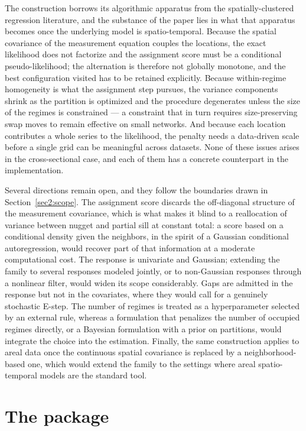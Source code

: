 The construction borrows its algorithmic apparatus from the spatially-clustered regression literature, and the substance of the paper lies in what that apparatus becomes once the underlying model is spatio-temporal. Because the spatial covariance of the measurement equation couples the locations, the exact likelihood does not factorize and the assignment score must be a conditional pseudo-likelihood; the alternation is therefore not globally monotone, and the best configuration visited has to be retained explicitly. Because within-regime homogeneity is what the assignment step pursues, the variance components shrink as the partition is optimized and the procedure degenerates unless the size of the regimes is constrained --- a constraint that in turn requires size-preserving swap moves to remain effective on small networks. And because each location contributes a whole series to the likelihood, the penalty needs a data-driven scale before a single grid can be meaningful across datasets. None of these issues arises in the cross-sectional case, and each of them has a concrete counterpart in the implementation.

Several directions remain open, and they follow the boundaries drawn in Section~\ref{sec2:scope}. The assignment score discards the off-diagonal structure of the measurement covariance, which is what makes it blind to a reallocation of variance between nugget and partial sill at constant total: a score based on a conditional density given the neighbors, in the spirit of a Gaussian conditional autoregression, would recover part of that information at a moderate computational cost. The response is univariate and Gaussian; extending the family to several responses modeled jointly, or to non-Gaussian responses through a nonlinear filter, would widen its scope considerably. Gaps are admitted in the response but not in the covariates, where they would call for a genuinely stochastic E-step. The number of regimes is treated as a hyperparameter selected by an external rule, whereas a formulation that penalizes the number of occupied regimes directly, or a Bayesian formulation with a prior on partitions, would integrate the choice into the estimation. Finally, the same construction applies to areal data once the continuous spatial covariance is replaced by a neighborhood-based one, which would extend the family to the settings where areal spatio-temporal models are the standard tool.

\appendix
\section{The \Stem{} package}\label{app:package}

